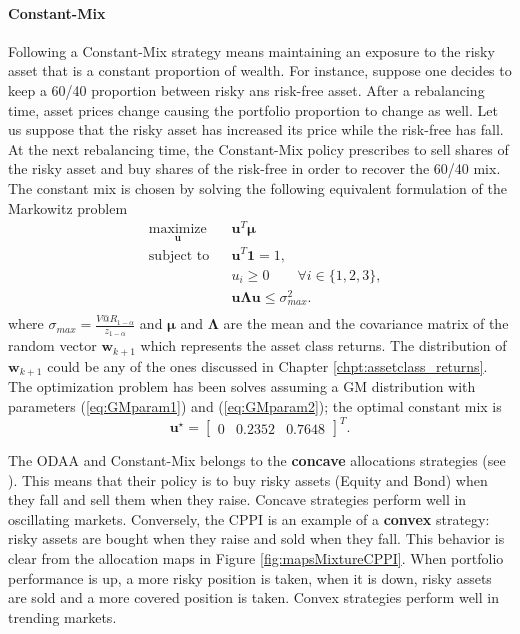 \paragraph{Constant-Mix}
Following a Constant-Mix strategy means maintaining an exposure to the risky asset that is a constant proportion of wealth. For instance, suppose one decides to keep a 60/40 proportion between risky ans risk-free asset. After a rebalancing time, asset prices change causing the portfolio proportion to change as well. Let us suppose that the risky asset has increased its price while the risk-free has fall. At the next rebalancing time, the Constant-Mix policy prescribes to sell shares of the risky asset and buy shares of the risk-free in order to recover the 60/40 mix. The constant mix is chosen by solving the following equivalent formulation of the Markowitz problem
\begin{equation*}
\begin{aligned}
& \underset{\bm{u}}{\text{maximize}} & &  \bm{u}^T\bm{\mu} \\
& \text{subject to} & & \bm{u}^T\bm{1}=1, \\
& & & u_i \geq 0 \qquad \forall i \in \{1,2,3\},\\
& & &\bm{u}\bm{\Lambda}\bm{u} \leq \sigma_{max}^2.\\
\end{aligned}
\end{equation*}
where $\sigma_{max}=\frac{V@R_{1-\alpha}}{z_{1-\alpha}}$ and $\bm{\mu}$ and $\bm{\Lambda}$ are the mean and the covariance matrix of the random vector $\bm{w}_{k+1}$ which represents the asset class returns.
The distribution of $\bm{w}_{k+1}$ could be any of the ones discussed in Chapter \ref{chpt:assetclass_returns}. The optimization problem has been solves assuming a GM distribution with parameters (\ref{eq:GMparam1}) and (\ref{eq:GMparam2}); the optimal constant mix is
\[ \bm{u}^{\star} = \begin{bmatrix} 0 & 0.2352 & 0.7648 \end{bmatrix}^T.\]


The ODAA and Constant-Mix belongs to the \textbf{concave} allocations strategies (see \cite{Plasse2013}). This means that their policy is to buy risky assets (Equity and Bond) when they fall and sell them when they raise. Concave strategies perform well in oscillating markets. Conversely, the \gls{CPPI} is an example of a \textbf{convex} strategy: risky assets are bought when they raise and sold when they fall. This behavior is clear from the allocation maps in Figure \ref{fig:mapsMixtureCPPI}. When portfolio performance is up, a more risky position is taken, when it is down, risky assets are sold and a more covered position is taken. Convex strategies perform well in trending markets.

